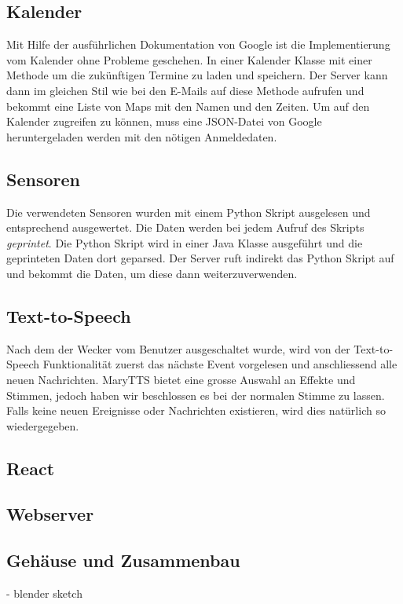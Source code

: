 \documentclass[11pt,a4paper]{article}
\begin{document}
\subsection{Kalender}
Mit Hilfe der ausführlichen Dokumentation von Google ist die Implementierung vom Kalender ohne Probleme geschehen. In einer Kalender Klasse mit einer Methode um die zukünftigen Termine zu laden und speichern. Der Server kann dann im gleichen Stil wie bei den E-Mails auf diese Methode aufrufen und bekommt eine Liste von Maps mit den Namen und den Zeiten. Um auf den Kalender zugreifen zu können, muss eine JSON-Datei von Google heruntergeladen werden mit den nötigen Anmeldedaten.

\subsection{Sensoren}
Die verwendeten Sensoren wurden mit einem Python Skript ausgelesen und entsprechend ausgewertet. Die Daten werden bei jedem Aufruf des Skripts \textit{geprintet}. Die Python Skript wird in einer Java Klasse ausgeführt und die geprinteten Daten dort geparsed. Der Server ruft indirekt das Python Skript auf und bekommt die Daten, um diese dann weiterzuverwenden.

\subsection{Text-to-Speech}
Nach dem der Wecker vom Benutzer ausgeschaltet wurde, wird von der Text-to-Speech Funktionalit\"at zuerst das n\"achste Event vorgelesen und anschliessend alle neuen Nachrichten. MaryTTS bietet eine grosse Auswahl an Effekte und Stimmen, jedoch haben wir beschlossen es bei der normalen Stimme zu lassen. Falls keine neuen Ereignisse oder Nachrichten existieren, wird dies natürlich so wiedergegeben.

\subsection{React}

\subsection{Webserver}

\subsection{Gehäuse und Zusammenbau}
- blender sketch
\end{document}
